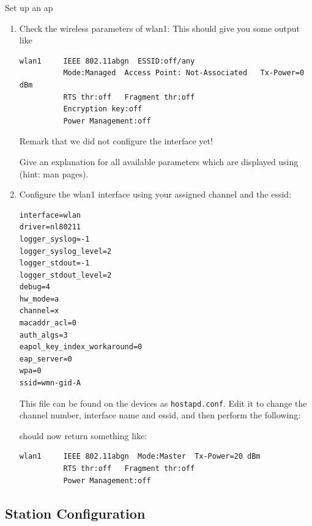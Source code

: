\begin{exercise}{Set up an \ac{ap}}
\begin{enumerate}
	\item Check the wireless parameters of wlan1:\newline
	\newline
	This should give you some output like
\begin{verbatim}
wlan1     IEEE 802.11abgn  ESSID:off/any  
          Mode:Managed  Access Point: Not-Associated   Tx-Power=0 dBm   
          RTS thr:off   Fragment thr:off
          Encryption key:off
          Power Management:off
\end{verbatim}

\remark Remark that we did not configure the interface yet!

Give an explanation for all available parameters which are displayed using  (hint: man pages).\newline
\begin{esolution}
\end{esolution}


\item Configure the wlan1 interface using your assigned channel and the \ac{essid}:\newline
\begin{lstlisting}
interface=wlan
driver=nl80211
logger_syslog=-1
logger_syslog_level=2
logger_stdout=-1
logger_stdout_level=2
debug=4
hw_mode=a
channel=x
macaddr_acl=0
auth_algs=3
eapol_key_index_workaround=0
eap_server=0
wpa=0
ssid=wmn-gid-A
\end{lstlisting}

This file can be found on the devices as \texttt{hostapd.conf}. Edit it to change the channel number, interface name and \ac{essid}, and then perform the following:\newline
{}

 should now return something like: 
\begin{verbatim}
wlan1     IEEE 802.11abgn  Mode:Master  Tx-Power=20 dBm   
          RTS thr:off   Fragment thr:off
          Power Management:off
\end{verbatim}

\end{enumerate}
\end{exercise}

\subsection{Station Configuration}

